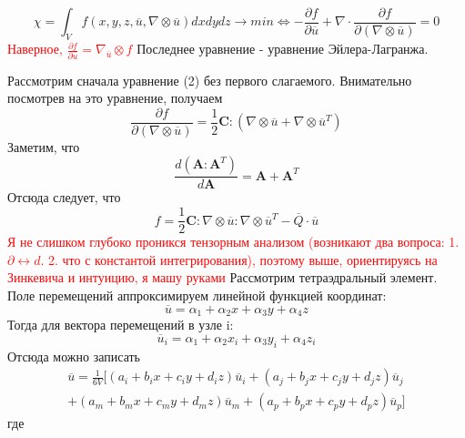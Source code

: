 \documentclass[a4paper,12pt]{article}
\begin{document}
\begin{equation}
\chi = \int_V f(x,y,z,\overline{u}, \nabla \otimes \overline{u})dxdydz  \rightarrow min \Longleftrightarrow -\frac{\partial f}{\partial \overline{u}} + \nabla \cdot \frac{\partial f}{\partial (\nabla \otimes \overline{u} )} = 0
\end{equation}
\textcolor{red}{ Наверное, $\frac{\partial f}{\partial \overline{u}} = \nabla_{\overline{u}} \otimes f$}
Последнее уравнение - уравнение Эйлера-Лагранжа. 
\par
Рассмотрим сначала уравнение (2) без первого слагаемого.
Внимательно посмотрев на это уравнение, получаем
\begin{equation}
    \frac{\partial f}{\partial (\nabla \otimes \overline{u} )} = \frac{1}{2}\textbf{C}:(\nabla \otimes \overline{u} + \nabla \otimes \overline{u}^T)
\end{equation}
Заметим, что
\begin{equation}
    \frac{d (\textbf{A}:\textbf{A}^T)}{d\textbf{A}} = \textbf{A} + \textbf{A}^T
\end{equation}
Отсюда следует, что
\begin{equation}
    f = \frac{1}{2}\textbf{C}:\nabla \otimes \overline{u} : \nabla \otimes \overline{u}^T - \overline{Q}\cdot \overline{u}
\end{equation}
\textcolor{red}{Я не слишком глубоко проникся тензорным анализом (возникают два вопроса: 1. $\partial \leftrightarrow d$. 2. что с константой интегрирования), поэтому выше, ориентируясь на Зинкевича и интуицию, я машу руками}
Рассмотрим тетраэдральный элемент. Поле перемещений аппроксимируем линейной функцией координат:
\begin{equation}
    \overline{u} = \alpha_1 + \alpha_2 x + \alpha_3 y + \alpha_4 z 
\end{equation}
Тогда для вектора перемещений в узле i:
\begin{equation}
    \overline{u}_i = \alpha_1 + \alpha_2 x_i + \alpha_3 y_i + \alpha_4 z_i
\end{equation}
Отсюда можно записать
\begin{equation}
\begin{split}
    \overline{u} = \frac{1}{6V}[(a_i + b_i x + c_i y + d_i z)\overline{u}_i + (a_j + b_j x + c_j y + d_j z)\overline{u}_j \\  + (a_m + b_m x + c_m y + d_m z)\overline{u}_m  + (a_p + b_p x + c_p y + d_p z)\overline{u}_p]
\end{split}
\end{equation}
где
\end{document}
